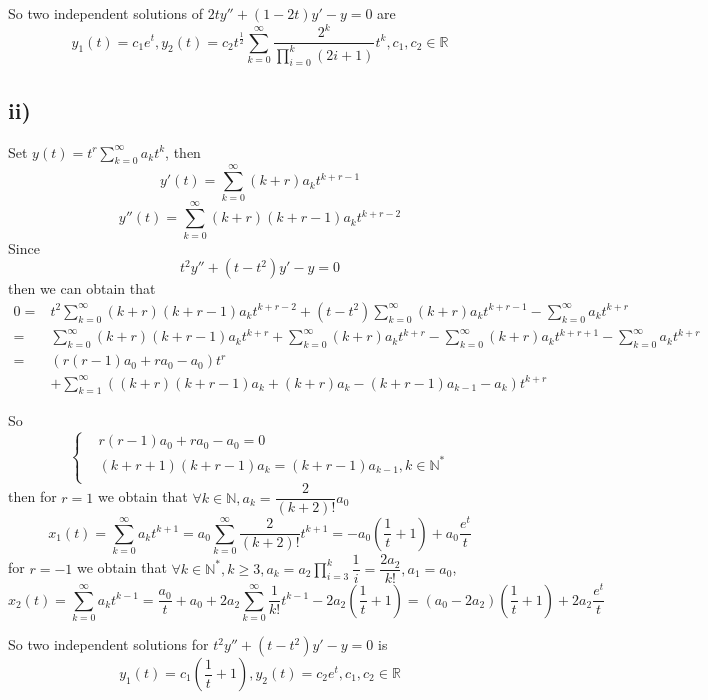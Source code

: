 \documentclass[a4paper,12pt,titlepage]{article}
\begin{document}
So two independent solutions of $2ty''+(1-2t)y'-y=0$ are
$$y_1(t)=c_1e^t,y_2(t)=c_2t^{\frac{1}{2}}\sum\limits_{k=0}^{\infty}\dfrac{2^k}{\prod\limits_{i=0}^k(2i+1)}t^k,c_1,c_2\in\mathbb{R}$$

\subsection*{ii)}
Set $y(t)=t^r\sum\limits_{k=0}^{\infty}a_kt^k$, then
$$y'(t)=\sum\limits_{k=0}^{\infty}(k+r)a_kt^{k+r-1}$$
$$y''(t)=\sum\limits_{k=0}^{\infty}(k+r)(k+r-1)a_kt^{k+r-2}$$
Since 
$$t^2y''+(t-t^2)y'-y=0$$
then we can obtain that
\begin{align*}
0=&t^2\sum\limits_{k=0}^{\infty}(k+r)(k+r-1)a_{k}t^{k+r-2}+(t-t^2)\sum\limits_{k=0}^{\infty}(k+r)a_kt^{k+r-1}-\sum\limits_{k=0}^{\infty}a_kt^{k+r}\\
=&\sum\limits_{k=0}^{\infty}(k+r)(k+r-1)a_{k}t^{k+r}+\sum\limits_{k=0}^{\infty}(k+r)a_{k}t^{k+r}-\sum\limits_{k=0}^{\infty}(k+r)a_k t^{k+r+1}-\sum\limits_{k=0}^{\infty}a_k t^{k+r}\\
=&(r(r-1)a_0+ra_0-a_0)t^{r}\\
&+\sum\limits_{k=1}^{\infty}((k+r)(k+r-1)a_{k}+(k+r)a_{k}-(k+r-1)a_{k-1}-a_k)t^{k+r}
\end{align*}

So
$$\left\{
\begin{aligned}
&r(r-1)a_0+ra_0-a_0=0\\
&(k+r+1)(k+r-1)a_{k}=(k+r-1)a_{k-1},k\in\mathbb{N}^*\\
\end{aligned}
\right.$$
then for $r=1$ we obtain that $\forall k\in\mathbb{N}, a_k=\dfrac{2}{(k+2)!}a_0$
$$x_1(t)=\sum\limits_{k=0}^{\infty}a_kt^{k+1}=a_0\sum\limits_{k=0}^{\infty}\dfrac{2}{(k+2)!}t^{k+1}=-a_0(\dfrac{1}{t}+1)+a_0\dfrac{e^t}{t}$$
for $r=-1$ we obtain that $\forall k\in\mathbb{N}^*,k\geqslant3, a_k=a_2\prod\limits_{i=3}^k\dfrac{1}{i}=\dfrac{2a_2}{k!},a_1=a_0$, 
$$x_2(t)=\sum\limits_{k=0}^{\infty}a_kt^{k-1}=\dfrac{a_0}{t}+a_0+2a_2\sum\limits_{k=0}^{\infty}\dfrac{1}{k!}t^{k-1}-2a_2(\dfrac{1}{t}+1)=(a_0-2a_2)(\dfrac{1}{t}+1)+2a_2\dfrac{e^t}{t}$$

So two independent solutions for $t^2y''+(t-t^2)y'-y=0$ is
$$y_1(t)=c_1(\dfrac{1}{t}+1),y_2(t)=c_2e^t,c_1,c_2\in\mathbb{R}$$
\end{document}
